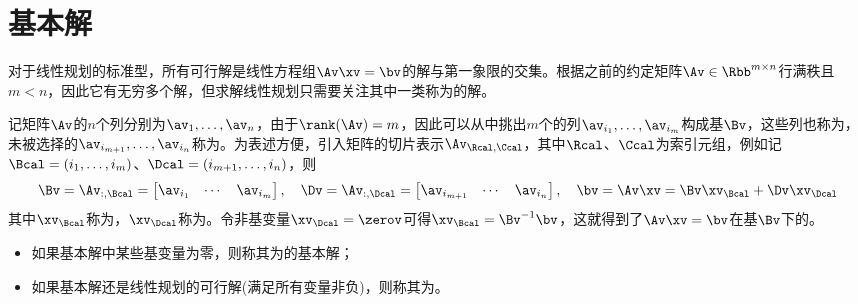 \documentclass{ctexart}
\begin{document}
\section{基本解}

对于线性规划的标准型，所有可行解是线性方程组$\Av \xv = \bv$的解与第一象限的交集。根据之前的约定矩阵$\Av \in \Rbb^{m \times n}$行满秩且$m < n$，因此它有无穷多个解，但求解线性规划只需要关注其中一类称为的解。

记矩阵$\Av$的$n$个列分别为$\av_1, \ldots, \av_n$，由于$\rank(\Av) = m$，因此可以从中挑出$m$个的列$\av_{i_1}, \ldots, \av_{i_m}$构成基$\Bv$，这些列也称为，未被选择的$\av_{i_{m+1}}, \ldots, \av_{i_n}$称为。为表述方便，引入矩阵的切片表示$\Av_{\Rcal,\Ccal}$，其中$\Rcal$、$\Ccal$为索引元组，例如记$\Bcal = (i_1, \ldots, i_m)$、$\Dcal = (i_{m+1}, \ldots, i_n)$，则
\begin{align*}
    \Bv = \Av_{:,\Bcal} =
    \begin{bmatrix}
        \av_{i_1} & \cdots & \av_{i_m}
    \end{bmatrix}, \quad
    \Dv = \Av_{:,\Dcal} =
    \begin{bmatrix}
        \av_{i_{m+1}} & \cdots & \av_{i_n}
    \end{bmatrix}, \quad \bv = \Av \xv = \Bv \xv_\Bcal + \Dv \xv_\Dcal
\end{align*}
其中$\xv_\Bcal$称为，$\xv_\Dcal$称为。令非基变量$\xv_\Dcal = \zerov$可得$\xv_\Bcal = \Bv^{-1} \bv$，这就得到了$\Av \xv = \bv$在基$\Bv$下的。
\begin{itemize}
    \item 如果基本解中某些基变量为零，则称其为的基本解；
    \item 如果基本解还是线性规划的可行解(满足所有变量非负)，则称其为。
\end{itemize}
\end{document}
